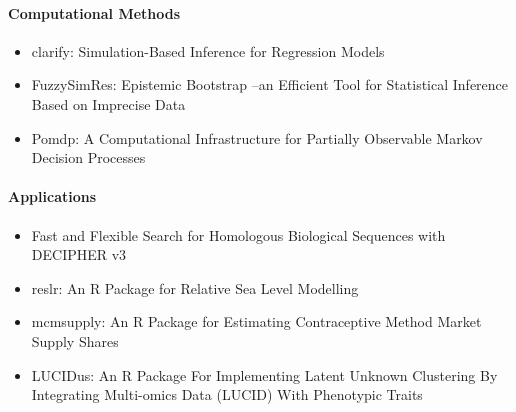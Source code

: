 \paragraph{Computational Methods}\label{computational-methods}

\begin{itemize}
\tightlist
\item
  clarify: Simulation-Based Inference for Regression Models
\item
  FuzzySimRes: Epistemic Bootstrap --an Efficient Tool for Statistical Inference Based on Imprecise Data
\item
  Pomdp: A Computational Infrastructure for Partially Observable Markov Decision Processes
\end{itemize}

\paragraph{Applications}\label{applications}

\begin{itemize}
\tightlist
\item
  Fast and Flexible Search for Homologous Biological Sequences with DECIPHER v3
\item
  reslr: An R Package for Relative Sea Level Modelling
\item
  mcmsupply: An R Package for Estimating Contraceptive Method Market Supply Shares
\item
  LUCIDus: An R Package For Implementing Latent Unknown Clustering By Integrating Multi-omics Data (LUCID) With Phenotypic Traits
\end{itemize}


\address{%
Mark P.J. van der Loo\\
Statistics Netherlands and Leiden University\\%
\\
%
\url{https://journal.r-project.org}\\%
%
\href{mailto:r-journal@r-project.org}{\nolinkurl{r-journal@r-project.org}}%
}
